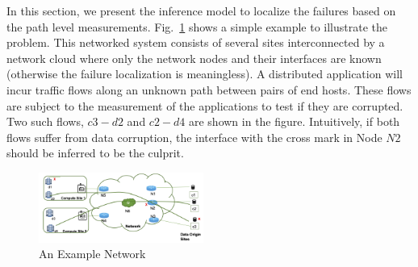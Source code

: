 In this section, we present the inference model to localize the failures based on the path level measurements. 
Fig.~\ref{fig:example} shows a simple example to illustrate the problem. This networked system consists of several sites interconnected by a network cloud 
where only the network nodes and their interfaces are known (otherwise the failure localization is meaningless). 
A distributed application will incur traffic flows along an unknown path between pairs of end hosts. These flows are subject to 
the measurement of the applications to test if they are corrupted. Two such flows, $c3-d2$ and $c2-d4$ are shown in the figure. Intuitively, 
if both flows suffer from data corruption, the interface with the cross mark in Node $N2$ should be inferred to be the culprit.   

\begin{figure}
  \begin{center}
    \includegraphics[width=0.48\textwidth]{./figure/example_network.png}
  \end{center}
\caption{An Example Network}
\label{fig:example}
\end{figure}

